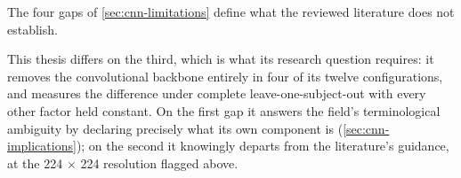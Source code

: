 The four gaps of \autoref{sec:cnn-limitations} define what the reviewed literature does not establish.

This thesis differs on the third, which is what its research question requires: it removes the convolutional backbone entirely in four of its twelve configurations, and measures the difference under complete leave-one-subject-out with every other factor held constant. On the first gap it answers the field's terminological ambiguity by declaring precisely what its own component is (\autoref{sec:cnn-implications}); on the second it knowingly departs from the literature's guidance, at the 224 $\times$ 224 resolution flagged above.
